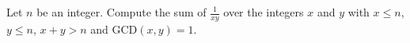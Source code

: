 Let $n$ be an integer. Compute the sum of $\frac{1}{xy}$ over the integers $x$ and $y$ with $x \leq n$, $y \leq n$, $x + y > n$ and $\mathrm{GCD}(x, y) = 1$.
